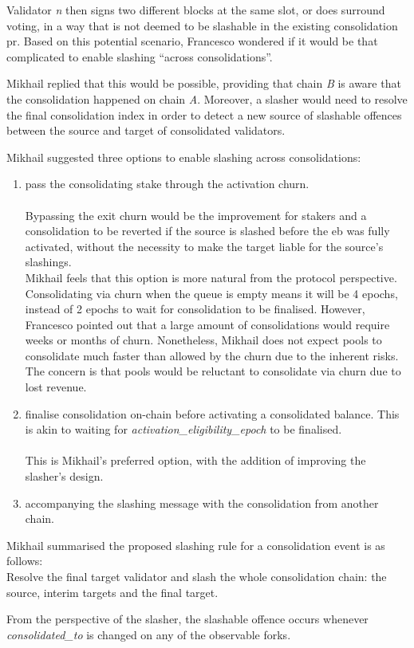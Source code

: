 Validator \textit{n} then signs two different blocks at the same slot, or does surround voting, in a way that is not deemed to be slashable in the existing consolidation \gls{pr}. Based on this potential scenario, Francesco wondered if it would be that complicated to enable slashing ``across consolidations''.

Mikhail replied that this would be possible, providing that chain \textit{B} is aware that the consolidation happened on chain \textit{A}. Moreover, a slasher would need to resolve the final consolidation index in order to detect a new source of slashable offences between the source and target of consolidated validators.

Mikhail suggested three options to enable slashing across consolidations:
\begin{enumerate}
\item pass the consolidating stake through the activation churn.\\
\\
Bypassing the exit churn would be the improvement for stakers and a consolidation to be reverted if the source is slashed before the \gls{eb} was fully activated, without the necessity to make the target liable for the source's slashings.\\
Mikhail feels that this option is more natural from the protocol perspective. Consolidating via churn when the queue is empty means it will be 4 epochs, instead of 2 epochs to wait for consolidation to be finalised. However, Francesco pointed out that a large amount of consolidations would require weeks or months of churn.  Nonetheless, Mikhail does not expect pools to consolidate much faster than allowed by the churn due to the inherent risks. The concern is that pools would be reluctant to consolidate via churn due to lost revenue. 

\item finalise consolidation on-chain before activating a consolidated balance. This is akin to waiting for \textit{activation\_eligibility\_epoch} to be finalised. \\
\\
This is Mikhail's preferred option, with the addition of improving the slasher's design.
\item accompanying the slashing message with the consolidation from another chain.
\end{enumerate}

Mikhail summarised the proposed slashing rule for a consolidation event is as follows: \\
\noindent
Resolve the final target validator and slash the whole consolidation chain: the source, interim targets and the final target.

From the perspective of the slasher, the slashable offence occurs whenever \textit{consolidated\_to} is changed on any of the observable forks. 


